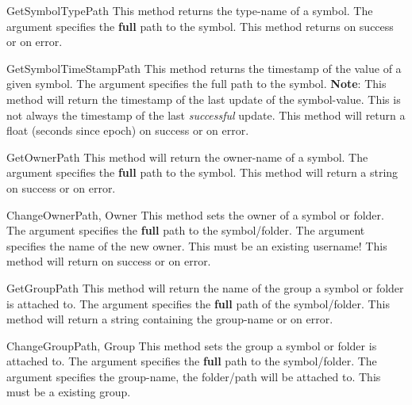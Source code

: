 \begin{methoddesc}[System]{GetSymbolType}{Path}
This method returns the type-name of a symbol. The argument  
specifies the \textbf{full} path to the symbol. This method returns 
 on success or  on error.
\end{methoddesc}


\begin{methoddesc}[System]{GetSymbolTimeStamp}{Path}
This method returns the timestamp of the value of a given symbol. The argument
 specifies the full path to the symbol. \textbf{Note}: This method
will return the timestamp of the last update of the symbol-value. This is not 
always the timestamp of the last \emph{successful} update. This method will 
return a float (seconds since epoch) on success or  on error.
\end{methoddesc}


\begin{methoddesc}[System]{GetOwner}{Path}
This method will return the owner-name of a symbol. The argument
 specifies the \textbf{full} path to the symbol. This method will
return a string on success or  on error.
\end{methoddesc}


\begin{methoddesc}[System]{ChangeOwner}{Path, Owner}
This method sets the owner of a symbol or folder. The argument  
specifies the \textbf{full} path to the symbol/folder. The argument 
 specifies the name of the new owner. This must be an existing 
username! This method will return  on success or  on
error.
\end{methoddesc}


\begin{methoddesc}[System]{GetGroup}{Path}
This method will return the name of the group a symbol or folder is attached 
to. The argument  specifies the \textbf{full} path of the 
symbol/folder. This method will return a string containing the group-name
or  on error.
\end{methoddesc}


\begin{methoddesc}[System]{ChangeGroup}{Path, Group}
This method sets the group a symbol or folder is attached to. The argument
 specifies the \textbf{full} path to the symbol/folder. The argument
 specifies the group-name, the folder/path will be attached to. This
must be a existing group.
\end{methoddesc}


